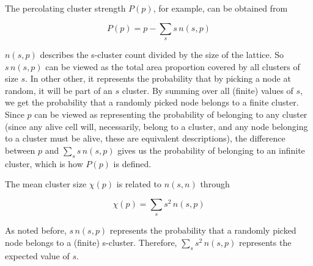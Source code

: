 The percolating cluster strength $P(p)$, for example, can be obtained from 

\begin{equation}
P(p) = p - \sum_s s\, n(s, p)
\end{equation}

$n(s, p)$ describes the s-cluster count divided by the size of the lattice. So $s\, n(s, p)$ can be viewed as the total area proportion covered by all clusters of size $s$. In other other, it represents the probability that by picking a node at random, it will be part of an $s$ cluster. By summing over all (finite) values of $s$, we get the probability that a randomly picked node belongs to a finite cluster. Since $p$ can be viewed as representing the probability of belonging to any cluster (since any
alive cell will, necessarily, belong to a cluster, and any node belonging to a cluster must be alive, these are equivalent descriptions), the difference between $p$ and $\sum_s s\, n(s, p)$ gives us the probability of belonging to an infinite cluster, which is how $P(p)$ is defined.


The mean cluster size $\chi(p)$ is related to $n(s, n)$ through 

\begin{equation}
    \chi(p) = \sum_s s^2\, n(s, p)
\end{equation}

As noted before, $s\, n(s, p)$ represents the probability that a randomly picked node belongs to a (finite) s-cluster. Therefore, $\sum_s s^2\, n(s, p)$ represents the expected value of $s$.


